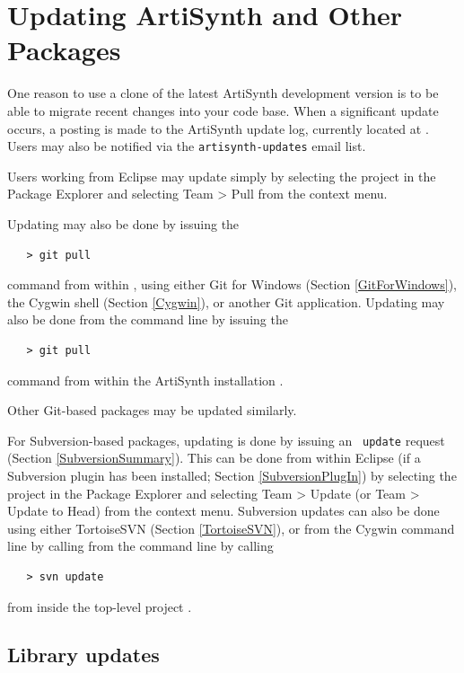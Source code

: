 \section{Updating ArtiSynth and Other Packages}
\label{UpdatingArtiSynth}

One reason to use a clone of the latest ArtiSynth
development version is to be able to migrate recent changes into your
code base. When a significant update occurs, a posting is made to the
ArtiSynth update log, currently located at
.
Users may also be notified via the {\tt artisynth-updates} email list.

Users working from Eclipse may update simply by selecting
the project in the {\sf Package Explorer} and selecting {\sf Team >
Pull} from the context menu.

\ifWindows
Updating may also be done by issuing the 
\begin{verbatim}
   > git pull
\end{verbatim}
command from within \ArtHome[], 
using either Git for Windows (Section \ref{GitForWindows}),
the Cygwin shell (Section \ref{Cygwin}), or another Git application.
\else %
Updating may also be done from the command line by issuing the 
\begin{verbatim}
   > git pull
\end{verbatim}
command from within the ArtiSynth installation \directory{}.
\fi %

Other Git-based packages may be updated similarly. 

For Subversion-based packages, updating is done by issuing an {\tt
update} request (Section \ref{SubversionSummary}). This can be done
from within Eclipse (if a Subversion plugin has been installed;
Section \ref{SubversionPlugIn}) by selecting the project in the {\sf
Package Explorer} and selecting {\sf Team > Update} (or {\sf Team >
Update to Head}) from the context menu. Subversion updates can also be
done
\ifWindows
using either TortoiseSVN (Section \ref{TortoiseSVN}), or from the
Cygwin command line by calling
\else %
from the command line by calling
\fi %
\begin{verbatim}
   > svn update
\end{verbatim}
from inside the top-level project \directory{}.

\subsection{Library updates}

